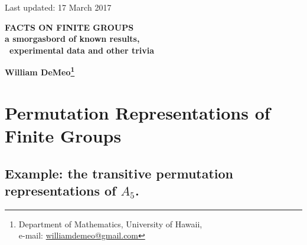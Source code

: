 \begin{flushright}
\vspace*{-1.1cm} {{\small \sffamily Last updated: 17 March 2017}}
\end{flushright}
\vspace{0.8cm}
\begin{center}
  {\large \bf FACTS ON FINITE GROUPS\\a smorgasbord of known results,\\ ~experimental data and other trivia
} \vspace*{3mm}


{\bf William DeMeo\footnote{Department of Mathematics, University of Hawaii,\\
    e-mail: \href{mailto:williamdemeo@gmail.com}{williamdemeo@gmail.com}}}
\end{center}

\begin{abstract}
  We present a rough, unpolished collection of potentially useful facts
  about finite groups, most of which are well known. Much of this information
  appeared previously in disperate unpublished research seminar notes.
  The author received requests to collect such information into a single document
  and post it for reference, so that it may be easily cited in other works.
  With this purpose in mind, the BibTeX data for citing this document appears on the
  last page.
\end{abstract}



\section{Permutation Representations of Finite Groups}
\label{sec:introduction}

\subsection{Example:  the transitive permutation representations of $A_5$.}
\label{subsection-a5}



